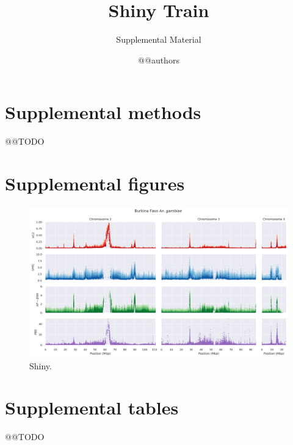 \documentclass[a4paper,11pt,abstracton,hidelinks]{scrartcl}
\title{
Shiny Train
}
\subtitle{\large{Supplemental Material}}
\author{@@authors}
\begin{document}
\maketitle

\beginsupplement

\clearpage


\section*{Supplemental methods}

@@TODO


\clearpage


\section*{Supplemental figures}

\begin{landscape}

\begin{figure}[H]
	\begin{center}
		\includegraphics*[width=1\linewidth,center]{artwork/gwss_bf_gam.png}
	\end{center}
	\caption{Shiny.}
	\label{fig:gwss_bf_gam}
\end{figure}

\end{landscape}

\clearpage


\section*{Supplemental tables}

@@TODO


\clearpage


\printbibliography
\end{document}
